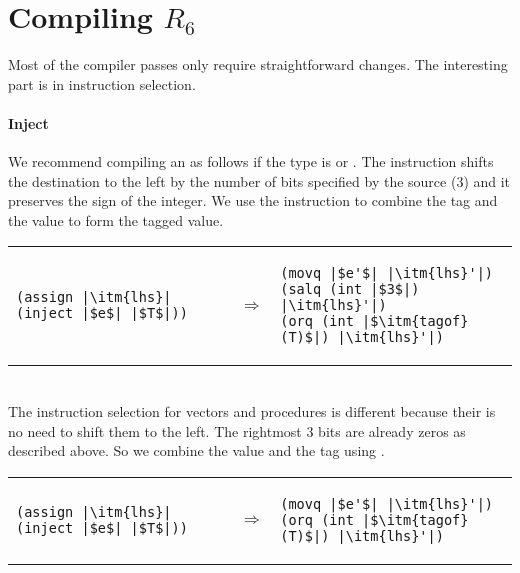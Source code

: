 \documentclass[11pt]{book}
\newcommand{\tagbits}{3} %
\begin{document}
\section{Compiling $R_6$}
\label{sec:compile-r6}

Most of the compiler passes only require straightforward changes.  The
interesting part is in instruction selection.

\paragraph{Inject}

We recommend compiling an  as follows if the type is
 or .  The  instruction shifts the
destination to the left by the number of bits specified by the source
(\tagbits) and it preserves the sign of the integer. We use the 
instruction to combine the tag and the value to form the tagged value.
\\
\begin{tabular}{lll}
\begin{minipage}{0.4\textwidth}
\begin{lstlisting}
(assign |\itm{lhs}| (inject |$e$| |$T$|))
\end{lstlisting}
\end{minipage}
&
$\Rightarrow$
&
\begin{minipage}{0.5\textwidth}
\begin{lstlisting}
(movq |$e'$| |\itm{lhs}'|)
(salq (int |$\tagbits$|) |\itm{lhs}'|)
(orq (int |$\itm{tagof}(T)$|) |\itm{lhs}'|)
\end{lstlisting}
\end{minipage}
\end{tabular}  \\
The instruction selection for vectors and procedures is different
because their is no need to shift them to the left. The rightmost 3
bits are already zeros as described above. So we combine the value and
the tag using
.  \\
\begin{tabular}{lll}
\begin{minipage}{0.4\textwidth}
\begin{lstlisting}
(assign |\itm{lhs}| (inject |$e$| |$T$|))
\end{lstlisting}
\end{minipage}
&
$\Rightarrow$
&
\begin{minipage}{0.5\textwidth}
\begin{lstlisting}
(movq |$e'$| |\itm{lhs}'|)
(orq (int |$\itm{tagof}(T)$|) |\itm{lhs}'|)
\end{lstlisting}
\end{minipage}
\end{tabular}  \\
\end{document}
